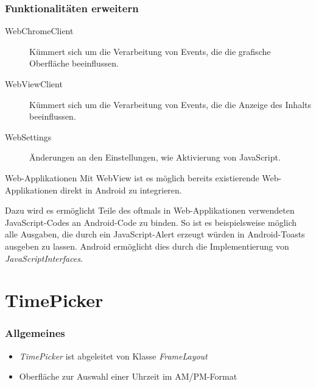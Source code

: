\begin{frame}
   \frametitle{Funktionalitäten erweitern}
   \begin{description}
      \item[WebChromeClient] Kümmert sich um die Verarbeitung von Events, die die 
         grafische Oberfläche beeinflussen.
      \item[WebViewClient]  Kümmert sich um die Verarbeitung von Events, die die 
         Anzeige des Inhalts beeinflussen.
      \item[WebSettings] Änderungen an den Einstellungen, wie Aktivierung von JavaScript.
   \end{description}

   \begin{alertblock}{Web-Applikationen}
      Mit WebView ist es möglich bereits existierende Web-Applikationen direkt 
      in Android zu integrieren.

      \vspace{5mm}

      Dazu wird es ermöglicht Teile des oftmals in Web-Applikationen verwendeten 
      JavaScript-Codes an Android-Code zu binden. So ist es beispielsweise möglich 
      alle Ausgaben, die durch ein JavaScript-Alert erzeugt würden in Android-Toasts 
      ausgeben zu lassen. Android ermöglicht dies durch die Implementierung 
      von \emph{JavaScriptInterfaces}.
   \end{alertblock}
\end{frame}

\section{TimePicker}
\begin{frame}[label=timepicker]
   \frametitle{Allgemeines}
   \begin{itemize}
      \item \emph{TimePicker} ist abgeleitet von Klasse \emph{FrameLayout}
      \item Oberfläche zur Auswahl einer Uhrzeit im AM/PM-Format
   \end{itemize}

   
\end{frame}

